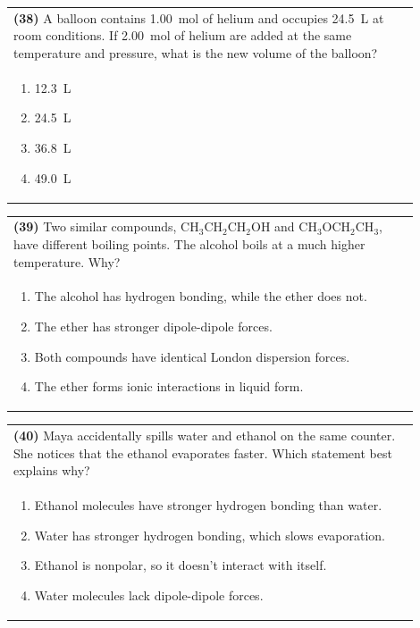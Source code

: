 \documentclass{article}
\begin{document}
\noindent\begin{tabular}{|p{0.9\linewidth}|}
\hline
\textbf{(38)} A balloon contains 1.00~mol of helium and occupies 24.5~L at room conditions. If 2.00~mol of helium are added at the same temperature and pressure, what is the new volume of the balloon?\\[0.2cm]
\begin{minipage}[t]{0.85\linewidth}
\begin{enumerate}[label=\alph*.]
\item 12.3~L
\item 24.5~L
\item 36.8~L
\item 49.0~L
\end{enumerate}
\end{minipage}\\[0.2cm]
\hline
\end{tabular}

\vspace{0.2cm}
\noindent\begin{tabular}{|p{0.9\linewidth}|}
\hline
\textbf{(39)} Two similar compounds, CH$_3$CH$_2$CH$_2$OH and CH$_3$OCH$_2$CH$_3$, have different boiling points. The alcohol boils at a much higher temperature. Why?\\[0.2cm]
\begin{minipage}[t]{0.85\linewidth}
\begin{enumerate}[label=\alph*.]
\item The alcohol has hydrogen bonding, while the ether does not.
\item The ether has stronger dipole-dipole forces.
\item Both compounds have identical London dispersion forces.
\item The ether forms ionic interactions in liquid form.
\end{enumerate}
\end{minipage}\\[0.2cm]
\hline
\end{tabular}

\noindent\begin{tabular}{|p{0.9\linewidth}|}
\hline
\textbf{(40)} Maya accidentally spills water and ethanol on the same counter. She notices that the ethanol evaporates faster. Which statement best explains why?\\[0.2cm]
\begin{minipage}[t]{0.85\linewidth}
\begin{enumerate}[label=\alph*.]
\item Ethanol molecules have stronger hydrogen bonding than water. 
\item Water has stronger hydrogen bonding, which slows evaporation.
\item Ethanol is nonpolar, so it doesn't interact with itself.
\item Water molecules lack dipole-dipole forces.
\end{enumerate}
\end{minipage}\\[0.2cm]
\hline
\end{tabular}
\newpage
\end{document}
